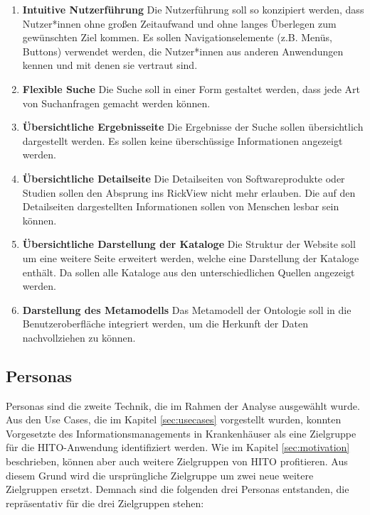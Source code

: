 \begin{enumerate}
\item \textbf{Intuitive Nutzerführung} \newline
Die Nutzerführung soll so konzipiert werden, dass Nutzer*innen ohne großen Zeitaufwand und ohne langes Überlegen zum gewünschten Ziel kommen. 
Es sollen Navigationselemente (z.B. Menüs, Buttons) verwendet werden, die Nutzer*innen aus anderen Anwendungen kennen und mit denen sie vertraut sind.
\item \textbf{Flexible Suche} \newline
Die Suche soll in einer Form gestaltet werden, dass jede Art von Suchanfragen gemacht werden können.
\item \textbf{\"Ubersichtliche Ergebnisseite} \newline
Die Ergebnisse der Suche sollen übersichtlich dargestellt werden.
Es sollen keine überschüssige Informationen angezeigt werden.
\item \textbf{\"Ubersichtliche Detailseite} \newline
Die Detailseiten von Softwareprodukte oder Studien sollen den Absprung ins RickView nicht mehr erlauben.
Die auf den Detailseiten dargestellten Informationen sollen von Menschen lesbar sein können.
\item \textbf{\"Ubersichtliche Darstellung der Kataloge} \newline
Die Struktur der Website soll um eine weitere Seite erweitert werden, welche eine Darstellung der Kataloge enthält.
Da sollen alle Kataloge aus den unterschiedlichen Quellen angezeigt werden.
\item \textbf{Darstellung des Metamodells} \newline
Das Metamodell der Ontologie soll in die Benutzeroberfläche integriert werden, um die Herkunft der Daten nachvollziehen zu können.
\end{enumerate}

\subsection{Personas}

Personas sind die zweite Technik, die im Rahmen der Analyse ausgewählt wurde.
Aus den Use Cases, die im Kapitel \ref{sec:usecases} vorgestellt wurden, konnten Vorgesetzte des Informationsmanagements in Krankenhäuser als eine Zielgruppe für die HITO-Anwendung identifiziert werden.
Wie im Kapitel \ref{sec:motivation} beschrieben, können aber auch weitere Zielgruppen von HITO profitieren.
Aus diesem Grund wird die ursprüngliche Zielgruppe um zwei neue weitere Zielgruppen ersetzt.
Demnach sind die folgenden drei Personas entstanden, die repräsentativ für die drei Zielgruppen stehen:

